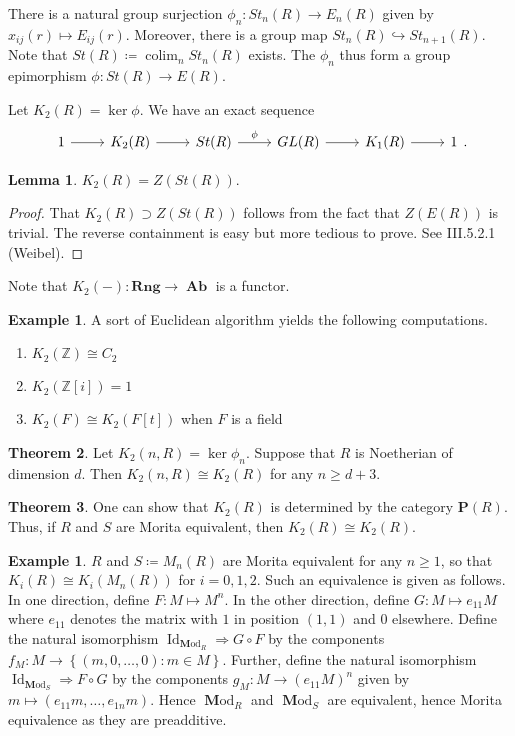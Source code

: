 \documentclass[10pt,letterpaper,cm]{nupset}
\theoremstyle{definition}
\newtheorem{exmp}[definition]{Example}
\theoremstyle{theorem}
\newtheorem{theorem}{Theorem}
\newtheorem{lemma}[theorem]{Lemma}
\theoremstyle{remark}
\renewcommand{\P}{\mathbf P}
\newcommand{\Z}{\mathbb Z}
\newcommand{\1}{\mathbf{1}}
\newcommand{\0}{\vec 0}
\DeclareMathOperator{\id}{Id}
\DeclareMathOperator{\colim}{colim}
\DeclareMathOperator{\Ab}{\mathbf{Ab}}
\DeclareMathOperator{\Mod}{\mathbf Mod}
\begin{document}
\smallskip

There is a natural group surjection $\phi_n : St_n(R) \to E_n(R)$ given by $x_{ij}(r) \mapsto E_{ij}(r)$. Moreover, there is a group map $St_n(R) \hookrightarrow St_{n+1}(R)$. Note that $St(R)\coloneqq \colim_n St_n(R)$ exists. The $\phi_n$ thus form a group epimorphism $\phi : St(R) \to E(R)$.


Let $K_2(R)  = \ker \phi$. We have an exact sequence
\[
\begin{tikzcd}
1 \arrow[r] & K_2(R) \arrow[r] & St(R) \arrow[r, "\phi"] & GL(R) \arrow[r] & K_1(R) \arrow[r] & 1
\end{tikzcd}.
\]


\begin{lemma}
$K_2(R) = Z(St(R))$.
\end{lemma}
\begin{proof}
That $K_2(R) \supset Z(St(R))$ follows from the fact that $Z(E(R))$ is trivial. The reverse containment is easy but more tedious to prove. See III.5.2.1 (Weibel).
\end{proof}

Note that
$K_2(-) : \mathbf{Rng} \to \Ab$ is a functor.


\begin{exmp} A sort of Euclidean algorithm yields the following computations.
\begin{enumerate}
\item $K_2(\Z) \cong C_2$
\item $K_2(\Z[i]) =1$
\item $K_2(F) \cong K_2(F[t])$ when $F$ is a field
\end{enumerate}
\end{exmp}

\begin{theorem}
Let $K_2(n, R) = \ker \phi_n$. Suppose that $R$ is Noetherian of dimension $d$. Then $K_2(n, R) \cong K_2(R)$ for any $n\geq d +3$.
\end{theorem}

\begin{theorem}
One can show that $K_2(R)$ is determined by the category $\P(R)$. Thus, if $R$ and $S$ are Morita equivalent, then $K_2(R) \cong K_2(R)$.
\end{theorem}

\begin{exmp}
$R$ and $S\coloneqq M_n(R)$ are Morita equivalent for any $n\geq 1$, so that $K_i(R) \cong K_i(M_n(R))$ for $i=0, 1, 2$. Such an equivalence is given as follows. In one direction, define $F: M \mapsto M^n$. In the other direction, define $G: M \mapsto e_{11}M$ where $e_11$ denotes the matrix with $1$ in position $(1, 1)$ and $0$ elsewhere. Define the natural isomorphism $\id_{\Mod_R} \Rightarrow G\circ F$ by the components $f_M : M \to \left\{(m, 0, \ldots, 0) : m \in M\right\}$. Further, define the natural isomorphism $\id_{\Mod_S} \Rightarrow F\circ G$ by the components  $g_M : M \to (e_{11}M)^n$ given by $m\mapsto (e_{11}m, \ldots, e_{1n}m)$. Hence $\Mod_R$ and $\Mod_S$ are equivalent, hence Morita equivalence as they are preadditive.
\end{exmp}
\end{document}
